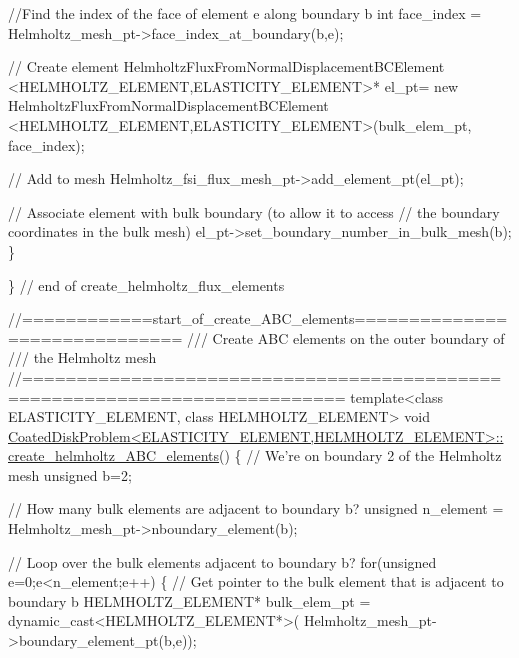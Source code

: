 \begin{DoxyCodeInclude}
{   \textcolor{comment}{//Find the index of the face of element e along boundary b}
   \textcolor{keywordtype}{int} face\_index = Helmholtz\_mesh\_pt->face\_index\_at\_boundary(b,e);
   
   \textcolor{comment}{// Create element}
   HelmholtzFluxFromNormalDisplacementBCElement
    <HELMHOLTZ\_ELEMENT,ELASTICITY\_ELEMENT>* el\_pt=
    \textcolor{keyword}{new} HelmholtzFluxFromNormalDisplacementBCElement
    <HELMHOLTZ\_ELEMENT,ELASTICITY\_ELEMENT>(bulk\_elem\_pt,
                                           face\_index);
   
   \textcolor{comment}{// Add to mesh}
   Helmholtz\_fsi\_flux\_mesh\_pt->add\_element\_pt(el\_pt);
   
   \textcolor{comment}{// Associate element with bulk boundary (to allow it to access}
   \textcolor{comment}{// the boundary coordinates in the bulk mesh)}
   el\_pt->set\_boundary\_number\_in\_bulk\_mesh(b); 
  \}  
  
\} \textcolor{comment}{// end of create\_helmholtz\_flux\_elements}



\textcolor{comment}{//============start\_of\_create\_ABC\_elements==============================}\textcolor{comment}{}
\textcolor{comment}{/// Create ABC elements on the outer boundary of }
\textcolor{comment}{/// the Helmholtz mesh}
\textcolor{comment}{}\textcolor{comment}{//===========================================================================}
\textcolor{keyword}{template}<\textcolor{keyword}{class} ELASTICITY\_ELEMENT, \textcolor{keyword}{class} HELMHOLTZ\_ELEMENT>
\textcolor{keywordtype}{void} \hyperlink{classCoatedDiskProblem_ade4e1e8fd2e8b0f7592f26514f3d18cc}{CoatedDiskProblem<ELASTICITY\_ELEMENT,HELMHOLTZ\_ELEMENT>::}
\hyperlink{classCoatedDiskProblem_ade4e1e8fd2e8b0f7592f26514f3d18cc}{create\_helmholtz\_ABC\_elements}()
\{
 \textcolor{comment}{// We're on boundary 2 of the Helmholtz mesh}
 \textcolor{keywordtype}{unsigned} b=2;

 \textcolor{comment}{// How many bulk elements are adjacent to boundary b?}
 \textcolor{keywordtype}{unsigned} n\_element = Helmholtz\_mesh\_pt->nboundary\_element(b);
 
 \textcolor{comment}{// Loop over the bulk elements adjacent to boundary b?}
 \textcolor{keywordflow}{for}(\textcolor{keywordtype}{unsigned} e=0;e<n\_element;e++)
  \{
   \textcolor{comment}{// Get pointer to the bulk element that is adjacent to boundary b}
   HELMHOLTZ\_ELEMENT* bulk\_elem\_pt = \textcolor{keyword}{dynamic\_cast<}HELMHOLTZ\_ELEMENT*\textcolor{keyword}{>}(
    Helmholtz\_mesh\_pt->boundary\_element\_pt(b,e));
   
}
\end{DoxyCodeInclude}
